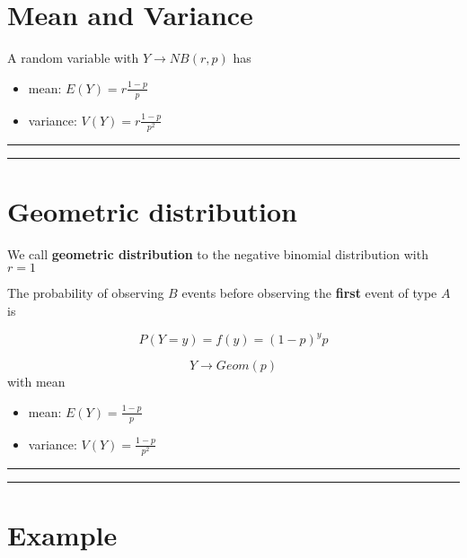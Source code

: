 \documentclass[
]{book}
\begin{document}
\hypertarget{mean-and-variance-2}{%
\section{Mean and Variance}\label{mean-and-variance-2}}

A random variable with \(Y\rightarrow NB(r,p)\) has

\begin{itemize}
\item
  mean: \(E(Y)= r\frac{1-p}{p}\)
\item
  variance: \(V(Y)= r\frac{1-p}{p^2}\)
\end{itemize}

\begin{center}\rule{0.5\linewidth}{0.5pt}\end{center}

\begin{center}\rule{0.5\linewidth}{0.5pt}\end{center}

\hypertarget{geometric-distribution}{%
\section{Geometric distribution}\label{geometric-distribution}}

We call \textbf{geometric distribution} to the negative binomial distribution with \(r=1\)

The probability of observing \(B\) events before observing the \textbf{first} event of type \(A\) is

\[P(Y=y)=f(y)= (1-p)^yp\]

\[Y\rightarrow Geom(p)\]
with mean

\begin{itemize}
\item
  mean: \(E(Y)= \frac{1-p}{p}\)
\item
  variance: \(V(Y)= \frac{1-p}{p^2}\)
\end{itemize}

\begin{center}\rule{0.5\linewidth}{0.5pt}\end{center}

\begin{center}\rule{0.5\linewidth}{0.5pt}\end{center}

\hypertarget{example-9}{%
\section{Example}\label{example-9}}
\end{document}
